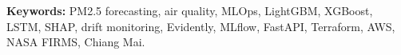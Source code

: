 \documentclass[11pt,a4paper]{report}
\begin{document}
\vspace{0.3cm}
\noindent \textbf{Keywords:} PM2.5 forecasting, air quality, MLOps,
LightGBM, XGBoost, LSTM, SHAP, drift monitoring, Evidently, MLflow,
FastAPI, Terraform, AWS, NASA FIRMS, Chiang Mai.

\cleardoublepage
\tableofcontents

\cleardoublepage
{}
\listoftables

\cleardoublepage
{}
\listoffigures



\cleardoublepage
{}












\end{document}
